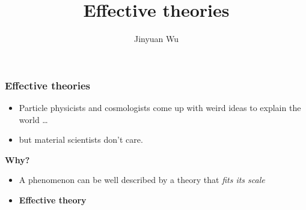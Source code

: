 \documentclass{beamer}
\title{Effective theories}
\author{Jinyuan Wu}
\newcommand{\concept}[1]{\textbf{#1}}
\begin{document}
\frame{\titlepage}

\begin{frame}
\frametitle{Effective theories}

\begin{itemize}
    \item Particle physicists and cosmologists come up with weird ideas to explain the world \dots
    \item but material scientists don't care. 
\end{itemize}

\textbf{Why?}

\begin{itemize}
    \item A phenomenon can be well described by a theory that \emph{fits its scale}
    \item \concept{Effective theory}
\end{itemize}

\end{frame}
\end{document}

